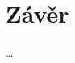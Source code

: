 \documentclass[twoside]{ctuthesis}
\begin{document}
\chapter{Závěr}
\ldots



\appendix

\end{document}
